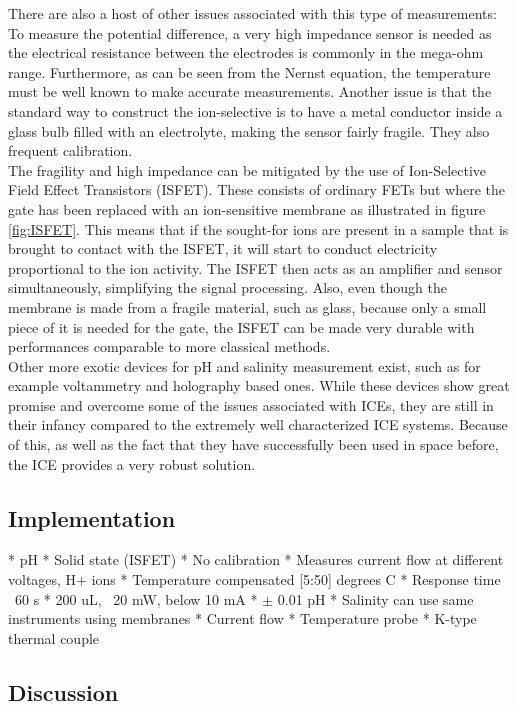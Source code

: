 \noindent
There are also a host of other issues associated with this type of measurements: To measure the potential difference, a very high impedance sensor is needed as the electrical resistance between the electrodes is commonly in the mega-ohm range\cite{website:ph3}. Furthermore, as can be seen from the Nernst equation, the temperature must be well known to make accurate measurements. Another issue is that the standard way to construct the ion-selective is to have a metal conductor inside a glass bulb filled with an electrolyte, making the sensor fairly fragile. They also frequent calibration.\\

\noindent
The fragility and high impedance can be mitigated by the use of Ion-Selective Field Effect Transistors (ISFET). These consists of ordinary FETs but where the gate has been replaced with an ion-sensitive membrane as illustrated in figure \ref{fig:ISFET}. This means that if the sought-for ions are present in a sample that is brought to contact with the ISFET, it will start to conduct electricity proportional to the ion activity. The ISFET then acts as an amplifier and sensor simultaneously, simplifying the signal processing\cite{website:ph4}. Also, even though the membrane is made from a fragile material, such as glass, because only a small piece of it is needed for the gate, the ISFET can be made very durable with performances comparable to more classical methods\cite{website:ph4}. \\ 

\noindent
Other more exotic devices for pH and salinity measurement exist, such as for example voltammetry\cite{website:senova} and holography\cite{article:marshall2003a} based ones. While these devices show great promise and overcome some of the issues associated with ICEs, they are still in their infancy compared to the extremely well characterized ICE systems. Because of this, as well as the fact that they have successfully been used in space before\cite{article:jgre2487}, the ICE provides a very robust solution.

\subsection{Implementation}
* pH
	* Solid state (ISFET)
		* No calibration
		* Measures current flow at different voltages, H+ ions
	* Temperature compensated [5:50] degrees C
		* Response time ~60 s
	* 200 uL, ~20 mW, below 10 mA
	* $\pm$ 0.01 pH
* Salinity can use same instruments using membranes
	* Current flow
* Temperature probe
	* K-type thermal couple


\subsection{Discussion}
